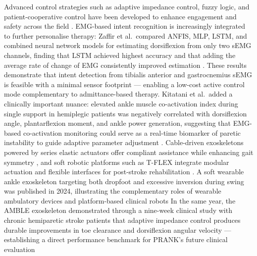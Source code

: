 Advanced control strategies such as adaptive impedance control, fuzzy logic, and patient-cooperative control have been developed to enhance engagement and safety across the field \cite{Jamwal2016, Zhang2018}.
EMG-based intent recognition is increasingly integrated to further personalise therapy: Zaffir et al.\ compared ANFIS, MLP, LSTM, and combined neural network models for estimating dorsiflexion from only two sEMG channels, finding that LSTM achieved highest accuracy and that adding the average rate of change of EMG consistently improved estimation \cite{zhang2021emg}.
These results demonstrate that intent detection from tibialis anterior and gastrocnemius sEMG is feasible with a minimal sensor footprint — enabling a low-cost active control mode complementary to admittance-based therapy.
Kitatani et al.\ added a clinically important nuance: elevated ankle muscle co-activation index during single support in hemiplegic patients was negatively correlated with dorsiflexion angle, plantarflexion moment, and ankle power generation, suggesting that EMG-based co-activation monitoring could serve as a real-time biomarker of paretic instability to guide adaptive parameter adjustment \cite{Zelik2018}.
Cable-driven exoskeletons powered by series elastic actuators offer compliant assistance while enhancing gait symmetry \cite{Zhong2022}, and soft robotic platforms such as T-FLEX integrate modular actuation and flexible interfaces for post-stroke rehabilitation \cite{Gomez-Vargas2020}.
A soft wearable ankle exoskeleton targeting both dropfoot and excessive inversion during swing was published in 2024, illustrating the complementary roles of wearable ambulatory devices and platform-based clinical robots %
In the same year, the AMBLE exoskeleton demonstrated through a nine-week clinical study with chronic hemiparetic stroke patients that adaptive impedance control produces durable improvements in toe clearance and dorsiflexion angular velocity — establishing a direct performance benchmark for PRANK's future clinical evaluation %


